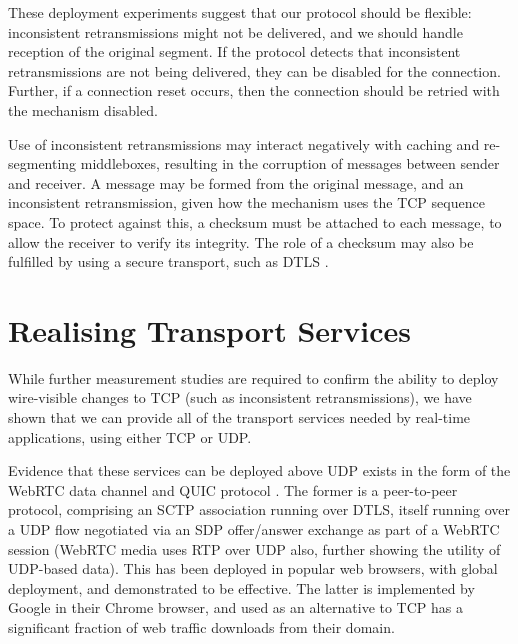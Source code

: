 \documentclass[10pt]{sig-alternate-05-2015}
\begin{document}
These deployment experiments suggest that our protocol should be
flexible: inconsistent retransmissions might not be delivered, and we should
handle reception of the original segment. If the protocol detects that
inconsistent retransmissions are not being delivered, they
can be disabled for the connection. Further, if a connection reset occurs,
then the connection should be retried with the mechanism disabled.

Use of inconsistent retransmissions may interact negatively with
caching and re-segmenting middleboxes, resulting in the corruption of
messages between sender and receiver. A message may be formed from the
original message, and an inconsistent retransmission, given how the
mechanism uses the TCP sequence space. To protect against this, a checksum
must be attached to each message, to allow the receiver to verify its
integrity. The role of a checksum may also be fulfilled by using a secure
transport, such as DTLS \cite{rfc:6347}.

\section{Realising Transport Services}
\label{sec:realising}

While further measurement studies are required to confirm the ability to
deploy wire-visible changes to TCP (such as inconsistent retransmissions),
we have shown that we can provide all of the transport services needed by
real-time applications, using either TCP or UDP.

Evidence that these services can be deployed above UDP exists in the form
of the WebRTC data channel \cite{draft-ietf-rtcweb-data-channel-13} and
QUIC protocol \cite{draft-tsvwg-quic-protocol-02}.
The former is a peer-to-peer protocol, comprising an SCTP association
running over DTLS, itself running over a UDP flow negotiated via an SDP
\cite{RFC4566} offer/answer exchange \cite{RFC3264} as part of a WebRTC
session \cite{jennings:2013:rtcweb} (WebRTC media uses RTP
over UDP also, further showing the utility of UDP-based data).
This has been deployed in popular web browsers, with global deployment, and
demonstrated to be effective.  The latter is implemented by Google in their
Chrome browser, and used as an alternative to TCP has a significant
fraction of web traffic downloads from their domain.

\end{document}
